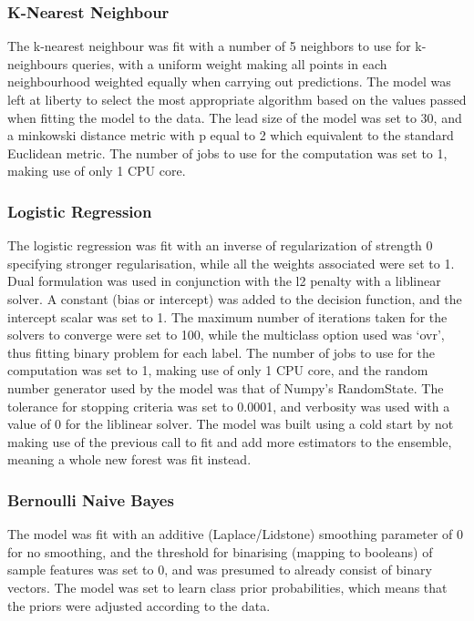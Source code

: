 \subsubsection{K-Nearest Neighbour}
The k-nearest neighbour was fit with a number of 5 neighbors to use for k-neighbours queries, with a uniform weight making all points in each neighbourhood weighted equally when carrying out predictions. The model was left at liberty to select the most appropriate algorithm based on the values passed when fitting the model to the data. The lead size of the model was set to 30, and a minkowski distance metric with p equal to 2 which equivalent to the standard Euclidean metric. The number of jobs to use for the computation was set to 1, making use of only 1 CPU core.

\subsubsection{Logistic Regression}
The logistic regression was fit with an inverse of regularization of strength 0 specifying stronger regularisation, while all the weights associated were set to 1. Dual formulation was used in conjunction with the l2 penalty with a liblinear solver. A constant (bias or intercept) was added to the decision function, and the intercept scalar was set to 1. The maximum number of iterations taken for the solvers to converge were set to 100, while the multiclass option used was ‘ovr’, thus fitting binary problem for each label.  The number of jobs to use for the computation was set to 1, making use of only 1 CPU core, and the random number generator used by the model was that of Numpy's RandomState. The tolerance for stopping criteria was set to 0.0001, and verbosity was used with a value of 0 for the liblinear solver. The model was built using a cold start by not making use of the previous call to fit and add more estimators to the ensemble, meaning a whole new forest was fit instead.

\subsubsection{Bernoulli Naive Bayes}
The model was fit with an additive (Laplace/Lidstone) smoothing parameter of 0 for no smoothing, and the threshold for binarising (mapping to booleans) of sample features was set to 0, and was presumed to already consist of binary vectors. The model was set to learn class prior probabilities, which means that the priors were adjusted according to the data.

